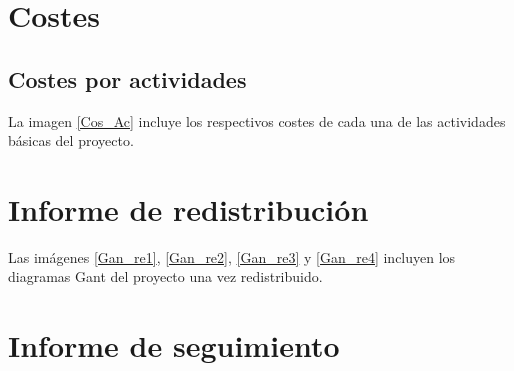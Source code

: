 \documentclass[11pt,a4paper,spanish,twoside]{book}
\begin{document}
\section{Costes}

\subsection{Costes por actividades}
La imagen \ref{Cos_Ac} incluye los respectivos costes de cada una de las
actividades básicas del proyecto. 

\begin{sidewaystable}
\end{sidewaystable}

\section{Informe de redistribución}
Las imágenes \ref{Gan_re1}, \ref{Gan_re2}, \ref{Gan_re3} y \ref{Gan_re4}
incluyen los diagramas Gant del proyecto una vez redistribuido.

\begin{sidewaystable}
\end{sidewaystable}

\begin{sidewaystable}
\end{sidewaystable}

\begin{sidewaystable}
\end{sidewaystable}

\begin{sidewaystable}
\end{sidewaystable}

\section{Informe de seguimiento}


 

\end{document}
